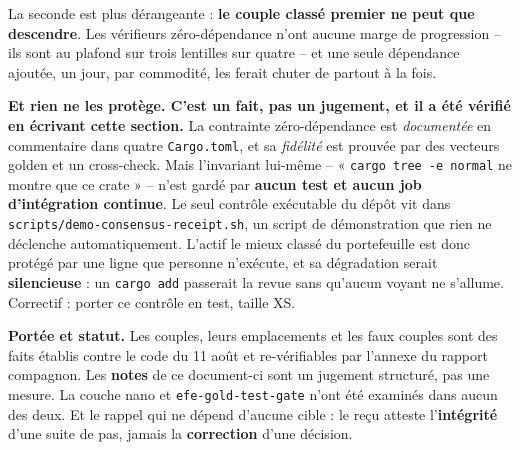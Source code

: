 \documentclass[10pt]{article}
\newcommand{\sz}[1]{{\small\color{grey}\textsf{#1}}}
\newcommand{\code}[1]{\texttt{\small #1}}
\begin{document}
La seconde est plus dérangeante : \textbf{le couple classé premier ne peut que descendre}. Les
vérifieurs zéro-dépendance n'ont aucune marge de progression -- ils sont au plafond sur trois lentilles
sur quatre -- et une seule dépendance ajoutée, un jour, par commodité, les ferait chuter de partout à
la fois.

\begin{alerte}
\textbf{Et rien ne les protège. C'est un fait, pas un jugement, et il a été vérifié en écrivant cette
section.} La contrainte zéro-dépendance est \emph{documentée} en commentaire dans quatre
\code{Cargo.toml}, et sa \emph{fidélité} est prouvée par des vecteurs golden et un cross-check. Mais
l'invariant lui-même -- « \code{cargo tree -e normal} ne montre que ce crate » -- n'est gardé par
\textbf{aucun test et aucun job d'intégration continue}. Le seul contrôle exécutable du dépôt vit dans
\code{scripts/demo-consensus-receipt.sh}, un script de démonstration que rien ne déclenche
automatiquement. L'actif le mieux classé du portefeuille est donc protégé par une ligne que personne
n'exécute, et sa dégradation serait \textbf{silencieuse} : un \code{cargo add} passerait la revue sans
qu'aucun voyant ne s'allume. \sz{Correctif : porter ce contrôle en test, taille XS.}
\end{alerte}

\begin{these}
\small\textbf{Portée et statut.} Les couples, leurs emplacements et les faux couples sont des faits
établis contre le code du 11 août et re-vérifiables par l'annexe du rapport compagnon. Les
\textbf{notes} de ce document-ci sont un jugement structuré, pas une mesure. La couche nano et
\code{efe-gold-test-gate} n'ont été examinés dans aucun des deux. Et le rappel qui ne dépend d'aucune
cible : le reçu atteste l'\textbf{intégrité} d'une suite de pas, jamais la \textbf{correction} d'une
décision.
\end{these}
\end{document}
